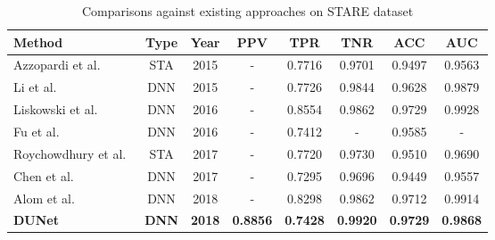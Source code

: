 \documentclass[journal]{IEEEtran}
\begin{document}
\begin{table}[]
\caption{Comparisons against existing approaches on STARE dataset}
\renewcommand\arraystretch{1.3}      
\renewcommand\tabcolsep{1.0pt} 
\begin{center}
\begin{tabular}{lccccccc}
\toprule
 Method & Type  & Year   & PPV   & TPR      & TNR   & ACC   & AUC        \\ \hline
 Azzopardi et al.~\cite{azzopardi_trainable_2015}  & STA   & 2015    & -   & 0.7716   & 0.9701 & 0.9497   & 0.9563          \\ 
 Li et al.~\cite{Li2015A} & DNN   & 2015    & -   & 0.7726   & 0.9844 & 0.9628   & 0.9879            \\
 Liskowski et al.~\cite{liskowski_segmenting_2016} & DNN   & 2016    & -   & 0.8554   & 0.9862 & 0.9729   & 0.9928           \\ 
 Fu et al.~\cite{fu_deepvessel:_2016}        & DNN        & 2016     & -   & 0.7412   & -      & 0.9585   & -               \\ 
 Roychowdhury et al.~\cite{Roychowdhury2017Blood} & STA & 2017    & -    & 0.7720   & 0.9730 & 0.9510   & 0.9690          \\ 
 Chen et al.~\cite{chen2017a}        & DNN        & 2017  & -    & 0.7295   & 0.9696 & 0.9449   & 0.9557          \\ 
 Alom et al.~\cite{alom_recurrent_2018}        & DNN        & 2018  & -    & 0.8298   & 0.9862 & 0.9712   & 0.9914          \\ 
 \textbf{DUNet}  & \textbf{DNN} & \textbf{2018} & \textbf{0.8856} & \textbf{0.7428} & \textbf{0.9920} & \textbf{0.9729} & \textbf{0.9868} \\ 
\bottomrule
\end{tabular}
\end{center}
\label{table:STARE_comparisons}
\end{table}
\end{document}
